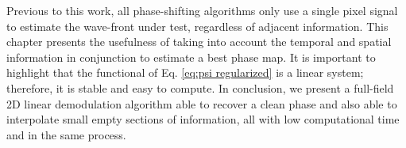 Previous to this work, all phase-shifting algorithms only use a single pixel
signal to estimate the wave-front under test, regardless of adjacent
information. This chapter presents the usefulness of taking into account the
temporal and spatial information in conjunction to estimate a best phase
map. It is important to highlight that the functional of Eq. \eqref{eq:psi
regularized} is a linear system; therefore, it is stable and easy to compute. 
In conclusion, we present a full-field 2D linear demodulation algorithm  able 
to recover a clean phase and also able to interpolate small empty sections of
information, all with low computational time and in the same process.


%
%


  
  
  

  
  
 
 

 
  
  
